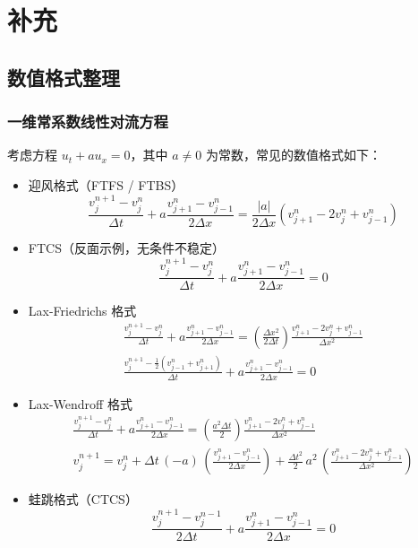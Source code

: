 \chapter{补充}

\section{数值格式整理}

\subsection*{一维常系数线性对流方程}

考虑方程 $u_t + a u_x = 0$，其中 $a \neq 0$ 为常数，常见的数值格式如下：
\begin{itemize}
    \item 迎风格式（FTFS / FTBS）
          \[
              \frac{v_j^{n+1} - v_j^n}{\Delta t} + a \frac{v_{j+1}^n - v_{j-1}^{n}}{2\Delta x} = \frac{|a|}{2\Delta x} (v_{j+1}^n - 2 v_j^n + v_{j-1}^{n})
          \]
    \item FTCS（反面示例，无条件不稳定）
          \[
              \frac{v_{j}^{n+1} - v_{j}^n}{\Delta t} + a \frac{v_{j+1}^n - v_{j-1}^n}{2\Delta x} = 0
          \]
    \item Lax-Friedrichs 格式
          \begin{gather*}
              \frac{v_j^{n+1}-v_j^n}{\Delta t} + a \frac{v_{j+1}^n-v_{j-1}^n}{2\Delta x} ={} \left(\frac{\Delta x^2}{2\Delta t}\right) \frac{v_{j+1}^n-2 v_j^n+v_{j-1}^n}{\Delta x^2}     \\
              \frac{v_j^{n+1}-\frac12(v_{j-1}^n+v_{j+1}^n)}{\Delta t} + a \frac{v_{j+1}^n-v_{j-1}^n}{2\Delta x} ={} 0
          \end{gather*}
    \item Lax-Wendroff 格式
          \begin{gather*}
              \frac{v_j^{n+1}-v_j^n}{\Delta t} + a \frac{v_{j+1}^n-v_{j-1}^n}{2\Delta x} = \left(\frac{a^2 \Delta t}{2}\right) \frac{v_{j+1}^n-2 v_j^n+v_{j-1}^n}{\Delta x^2} \\
              v_{j}^{n+1} = v_j^n + \Delta t \,(-a)\,\left(\frac{v_{j+1}^n- v_{j-1}^n}{2\Delta x}\right)
              + \frac{\Delta t^2}2\,a^2\,\left(\frac{v_{j+1}^n-2v_{j}^n+v_{j-1}^n}{\Delta x^2}\right)
          \end{gather*}
    \item 蛙跳格式（CTCS）
          \[
              \frac{v_{j}^{n+1} - v_{j}^{n-1}}{2\Delta t} + a \frac{v_{j+1}^n - v_{j-1}^n}{2\Delta x} = 0
\]
\end{itemize}
